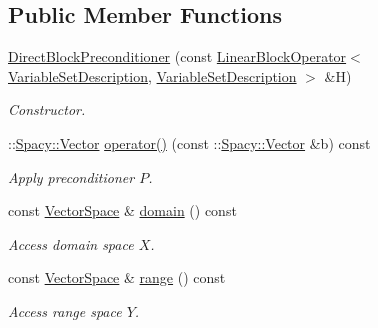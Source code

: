 \subsection*{Public Member Functions}
\begin{DoxyCompactItemize}
\item 
\hyperlink{classSpacy_1_1KaskadeParabolic_1_1OCP_1_1DirectBlockPreconditioner_a723ecc01ee4ab2c66bde2c8d242c23f6}{Direct\-Block\-Preconditioner} (const \hyperlink{classSpacy_1_1KaskadeParabolic_1_1OCP_1_1LinearBlockOperator}{Linear\-Block\-Operator}$<$ \hyperlink{classSpacy_1_1KaskadeParabolic_1_1OCP_1_1DirectBlockPreconditioner_a7b268f830d36a01c2390b98c9fd03b4a}{Variable\-Set\-Description}, \hyperlink{classSpacy_1_1KaskadeParabolic_1_1OCP_1_1DirectBlockPreconditioner_a7b268f830d36a01c2390b98c9fd03b4a}{Variable\-Set\-Description} $>$ \&H)
\begin{DoxyCompactList}\small\item\em Constructor. \end{DoxyCompactList}\item 
\-::\hyperlink{classSpacy_1_1Vector}{Spacy\-::\-Vector} \hyperlink{classSpacy_1_1KaskadeParabolic_1_1OCP_1_1DirectBlockPreconditioner_a14ba770316ccfcbf4335c55f5f4eeaf2}{operator()} (const \-::\hyperlink{classSpacy_1_1Vector}{Spacy\-::\-Vector} \&b) const 
\begin{DoxyCompactList}\small\item\em Apply preconditioner $P$. \end{DoxyCompactList}\item 
\hypertarget{classSpacy_1_1OperatorBase_a2588f9b3e0188820c4c494e63293dc6f}{const \hyperlink{classSpacy_1_1VectorSpace}{Vector\-Space} \& \hyperlink{classSpacy_1_1OperatorBase_a2588f9b3e0188820c4c494e63293dc6f}{domain} () const }\label{classSpacy_1_1OperatorBase_a2588f9b3e0188820c4c494e63293dc6f}

\begin{DoxyCompactList}\small\item\em Access domain space $X$. \end{DoxyCompactList}\item 
\hypertarget{classSpacy_1_1OperatorBase_ab19d3b7a6f290b1079248f1e567e53d6}{const \hyperlink{classSpacy_1_1VectorSpace}{Vector\-Space} \& \hyperlink{classSpacy_1_1OperatorBase_ab19d3b7a6f290b1079248f1e567e53d6}{range} () const }\label{classSpacy_1_1OperatorBase_ab19d3b7a6f290b1079248f1e567e53d6}

\begin{DoxyCompactList}\small\item\em Access range space $Y$. \end{DoxyCompactList}\end{DoxyCompactItemize}


